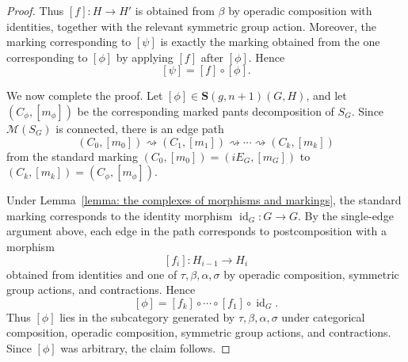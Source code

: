 \documentclass[10pt,a4paper]{amsart}
\newcommand{\bS}{\mathbf{S}}
\newcommand{\calM}{\mathcal{M}}
\newcommand{\id}{\operatorname{id}}
\begin{document}
\begin{proof}
Thus $[f]:H\to H'$ is obtained from $\beta$ by operadic composition with identities, together with the relevant symmetric group action. Moreover, the marking corresponding to $[\psi]$ is exactly the marking obtained from the one corresponding to $[\phi]$ by applying $[f]$ after $[\phi]$. Hence
\[
[\psi]=[f]\circ[\phi].
\]


We now complete the proof. Let $[\phi]\in \bS(g,n+1)(G,H)$, and let $(C_\phi,[m_\phi])$ be the corresponding marked pants decomposition of $S_G$. Since $\calM(S_G)$ is connected, there is an edge path
\[
(C_0,[m_0])\rightsquigarrow (C_1,[m_1])
\rightsquigarrow \cdots \rightsquigarrow (C_k,[m_k])
\]
from the standard marking $(C_0,[m_0])=(iE_G,[m_G])$ to $(C_k,[m_k])=(C_\phi,[m_\phi])$.

Under Lemma~\ref{lemma: the complexes of morphisms and markings}, the standard marking corresponds to the identity morphism $\id_G:G\to G$. By the single-edge argument above, each edge in the path corresponds to postcomposition with a morphism
\[
[f_i]:H_{i-1}\to H_i
\]
obtained from identities and one of $\tau,\beta,\alpha,\sigma$ by operadic composition, symmetric group actions, and contractions. Hence
\[
[\phi]=[f_k]\circ\cdots\circ [f_1]\circ \id_G.
\]
Thus $[\phi]$ lies in the subcategory generated by $\tau,\beta,\alpha,\sigma$ under categorical composition, operadic composition, symmetric group actions, and contractions. Since $[\phi]$ was arbitrary, the claim follows.
\end{proof}
\end{document}
